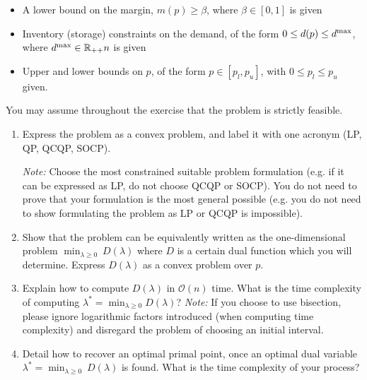 \documentclass[11pt]{article}
\begin{document}
\begin{itemize}
    \item A lower bound on the margin, $m(p) \ge \beta$, where $\beta \in [0,1]$ is given
    \item Inventory (storage) constraints on the demand, of the form $0 \le d(p) \le d^{\rm max}$, where $d^{\rm max} \in \mathbb{R}_{++}{n}$ is given
    \item Upper and lower bounds on $p$, of the form $p \in [p_l ,p_u]$, with $0 \le p_l \le p_u$ given.
\end{itemize}

You may assume throughout the exercise that the problem is strictly feasible.
\begin{enumerate}
    \item Express the problem as a convex problem, and label it with one acronym (LP, QP, QCQP, SOCP).

    \textit{Note: } Choose the most constrained suitable problem formulation (e.g. if it can be expressed as LP, do not choose QCQP or SOCP). You do not need to prove that your formulation is the most general possible (e.g. you do not need to show formulating the problem as LP or QCQP is impossible).

    \item Show that the problem can be equivalently written as the one-dimensional problem $\min_{\lambda \ge 0} \: D(\lambda) $ where $D$ is a certain dual function which you will determine. Express $D(\lambda)$ as a convex problem over $p$.

    \item Explain how to compute $D(\lambda)$ in $\mathcal{O}(n)$ time. What is the time complexity of computing $\lambda^*= \min_{\lambda\geq 0} D(\lambda)$?
    \textit{Note: } If you choose to use bisection, please ignore logarithmic factors introduced (when computing time complexity) and disregard the problem of choosing an initial interval.

    \item Detail how to recover an optimal primal point, once an optimal dual variable $\lambda^* =\min_{\lambda \ge 0} \: D(\lambda)$ is found. What is the time complexity of your process?
\end{enumerate}
\end{document}

